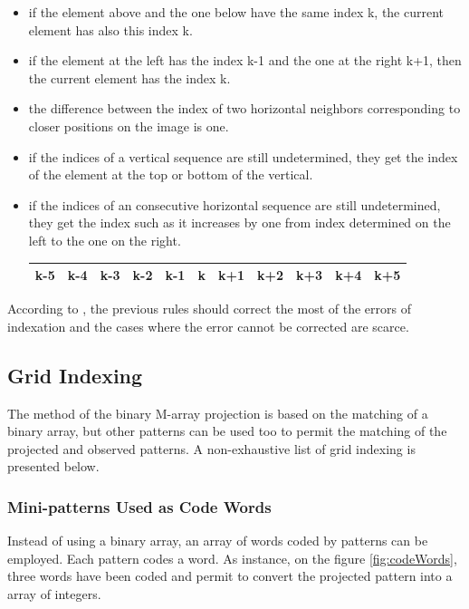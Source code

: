 \begin{itemize}
\item if the element above and the one below have the same index k, the current element has also this index k.
\item if the element at the left has the index k-1 and the one at the right k+1, then the current element has the index k.
\item the difference between the index of two horizontal neighbors corresponding to closer positions on the image is one.
\item if the indices of a vertical sequence are still undetermined, they get the index of the element at the top or bottom of the vertical.

\item if the indices of an consecutive horizontal sequence are still undetermined, they get the index such as it increases by one from index determined on the left to the one on the right.
\begin{tabular}{|*{11}{c|}}
    \hline
     k-5  & k-4  & k-3  & \textcolor[rgb]{1,0,0}{k-2}  & \textcolor[rgb]{1,0,0}{k-1}  & \textcolor[rgb]{1,0,0}{k}  & \textcolor[rgb]{1,0,0}{k+1}  & k+2  & k+3  & k+4 & k+5 \\
    \hline
\end{tabular}
\end{itemize}

According to \cite{morita1988reconstruction}, the previous rules should correct the most of the errors of indexation and the cases where the error cannot be corrected are scarce.







\subsection{Grid Indexing}

The method of the binary M-array projection is based on the matching of a binary array, but other patterns can be used too to permit the matching of the projected and observed patterns. A non-exhaustive list of grid indexing is presented below.

\subsubsection{Mini-patterns Used as Code Words}

Instead of using a binary array, an array of words coded by patterns can be employed. Each pattern codes a word. As instance, on the figure \ref{fig:codeWords}, three words have been coded and permit to convert the projected pattern into a array of integers.


